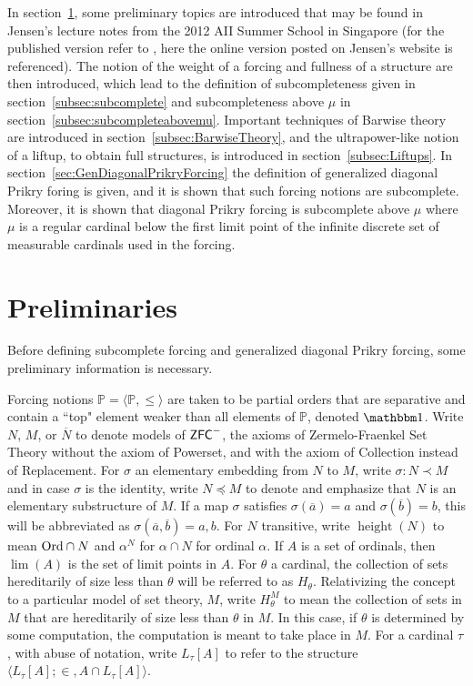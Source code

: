 \documentclass{amsart}
\theoremstyle{definition}
\theoremstyle{remark}
\renewcommand{\P}{\mathbb{P}}
\newcommand{\N}{{\overline{N}}}
\newcommand{\ZFC}{\textup{\ensuremath{\textsf{ZFC}}}}
\newcommand{\Ord}{\textup{\ensuremath{\text{Ord}}}}
\DeclareMathOperator{\height}{height}
\begin{document}
In section~\ref{sec:preliminaries}, some preliminary topics are introduced that may be found in Jensen's lecture notes from the 2012 AII Summer School in Singapore (for the published version refer to \cite{Jensen:2014}, here the online version posted on Jensen's website is referenced). The notion of the weight of a forcing and fullness of a structure are then introduced, which lead to the definition of subcompleteness given in section~\ref{subsec:subcomplete} and subcompleteness above $\mu$ in section~\ref{subsec:subcompleteabovemu}. Important techniques of Barwise theory are introduced in section~\ref{subsec:BarwiseTheory}, and the ultrapower-like notion of a liftup, to obtain full structures, is introduced in section~\ref{subsec:Liftups}. In section~\ref{sec:GenDiagonalPrikryForcing} the definition of generalized diagonal Prikry foring is given, and it is shown that such forcing notions are subcomplete. Moreover, it is shown that diagonal Prikry forcing is subcomplete above $\mu$ where $\mu$ is a regular cardinal below the first limit point of the infinite discrete set of measurable cardinals used in the forcing.

\section{Preliminaries} \label{sec:preliminaries}
Before defining subcomplete forcing and generalized diagonal Prikry forcing, some preliminary information is necessary.

Forcing notions $\P = \langle \P, \leq \rangle$ are taken to be partial orders that are separative and contain a ``top" element weaker than all elements of $\P$, denoted $\mathbbm 1$.
Write $N$, $M$, or $\N$ to denote models of $\ZFC^-$, the axioms of Zermelo-Fraenkel Set Theory without the axiom of \textsf{Powerset}, and with the axiom of \textsf{Collection} instead of \textsf{Replacement}. For $\sigma$ an elementary embedding from $N$ to $M$, write $\sigma: N \prec M$ and in case $\sigma$ is the identity, write $N \preccurlyeq M$ to denote and emphasize that $N$ is an elementary substructure of $M$. 
If a map $\sigma$ satisfies $\sigma(\overline a)=a$ and $\sigma(\overline b)=b$, this will be abbreviated as $\sigma(\overline a,\overline b)=a,b$.
For $N$ transitive, write $\height(N)$ to mean $\Ord \cap N$ and $\alpha^N$ for $\alpha \cap N$ for ordinal $\alpha$.
If $A$ is a set of ordinals, then $\lim(A)$ is the set of limit points in $A$.  
For $\theta$ a cardinal, the collection of sets hereditarily of size less than $\theta$ will be referred to as $H_\theta$. Relativizing the concept to a particular model of set theory, $M$, write $H_\theta^M$ to mean the collection of sets in $M$ that are hereditarily of size less than $\theta$ in $M$. In this case, if $\theta$ is determined by some computation, the computation is meant to take place in $M$.
For a cardinal $\tau$, with abuse of notation, write $L_\tau[A]$ to refer to the structure $\langle L_\tau[A]; \in, A \cap L_\tau[A] \rangle$. 
\end{document}
